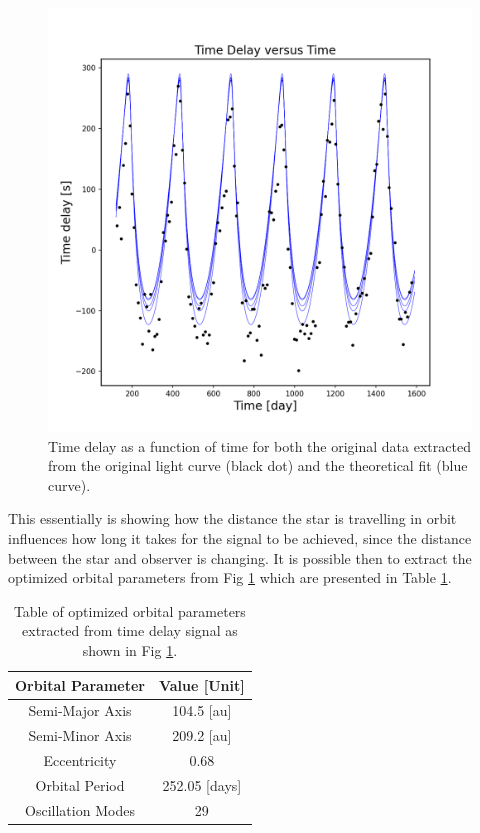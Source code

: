 \documentclass[]{article}
\begin{document}
\begin{figure}[H]
    \centering
    \includegraphics[width=1\linewidth]{time_delay.png}
    \caption{Time delay as a function of time for both the original data extracted from the original light curve (black dot) and the theoretical fit (blue curve).}
    \label{fig:timedelay}
\end{figure}
This essentially is showing how the distance the star is travelling in orbit influences how long it takes for the signal to be achieved, since the distance between the star and observer is changing. It is possible then to extract the optimized orbital parameters from Fig \ref{fig:timedelay} which are presented in Table \ref{tab: OptParam}.
\begin{table}[htp] 
\centering
\caption{Table of optimized orbital parameters extracted from time delay signal as shown in Fig \ref{fig:timedelay}.}
\setlength{\extrarowheight}{2pt}
\begin{tabular}{c | c}
    \hline \hline
Orbital Parameter & Value [Unit]\\
\hline
    Semi-Major Axis  & 104.5 [au]  \\
    Semi-Minor Axis & 209.2 [au] \\
    Eccentricity & 0.68 \\
    Orbital Period & 252.05 [days] \\
    Oscillation Modes & 29 \\
    \hline
\end{tabular} 
\label{tab: OptParam}
\end{table}
\end{document}
